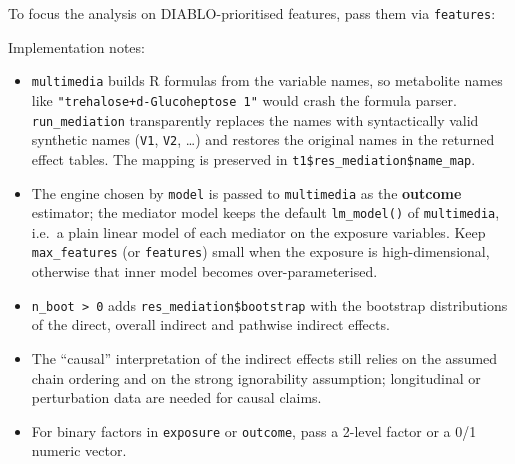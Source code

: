 \documentclass[
]{book}
\newenvironment{Shaded}{\begin{snugshade}}{\end{snugshade}}
\newcommand{\AttributeTok}[1]{\textcolor[rgb]{0.13,0.29,0.53}{#1}}
\newcommand{\DecValTok}[1]{\textcolor[rgb]{0.00,0.00,0.81}{#1}}
\newcommand{\FunctionTok}[1]{\textcolor[rgb]{0.13,0.29,0.53}{\textbf{#1}}}
\newcommand{\NormalTok}[1]{#1}
\newcommand{\OtherTok}[1]{\textcolor[rgb]{0.56,0.35,0.01}{#1}}
\newcommand{\SpecialCharTok}[1]{\textcolor[rgb]{0.81,0.36,0.00}{\textbf{#1}}}
\newcommand{\StringTok}[1]{\textcolor[rgb]{0.31,0.60,0.02}{#1}}
\providecommand{\tightlist}{%
  \setlength{\itemsep}{0pt}\setlength{\parskip}{0pt}}
\begin{document}
To focus the analysis on DIABLO-prioritised features, pass them via \texttt{features}:

\begin{Shaded}
\end{Shaded}

Implementation notes:

\begin{itemize}
\tightlist
\item
  \texttt{multimedia} builds R formulas from the variable names, so metabolite names like \texttt{"trehalose+d-Glucoheptose\ 1"} would crash the formula parser.
  \texttt{run\_mediation} transparently replaces the names with syntactically valid synthetic names (\texttt{V1}, \texttt{V2}, \ldots) and restores the original names in the returned effect tables.
  The mapping is preserved in \texttt{t1\$res\_mediation\$name\_map}.
\item
  The engine chosen by \texttt{model} is passed to \texttt{multimedia} as the \textbf{outcome} estimator; the mediator model keeps the default \texttt{lm\_model()} of \texttt{multimedia}, i.e.~a plain linear model of each mediator on the exposure variables.
  Keep \texttt{max\_features} (or \texttt{features}) small when the exposure is high-dimensional, otherwise that inner model becomes over-parameterised.
\item
  \texttt{n\_boot\ \textgreater{}\ 0} adds \texttt{res\_mediation\$bootstrap} with the bootstrap distributions of the direct, overall indirect and pathwise indirect effects.
\item
  The ``causal'' interpretation of the indirect effects still relies on the assumed chain ordering and on the strong ignorability assumption; longitudinal or perturbation data are needed for causal claims.
\item
  For binary factors in \texttt{exposure} or \texttt{outcome}, pass a 2-level factor or a 0/1 numeric vector.
\end{itemize}
\end{document}
